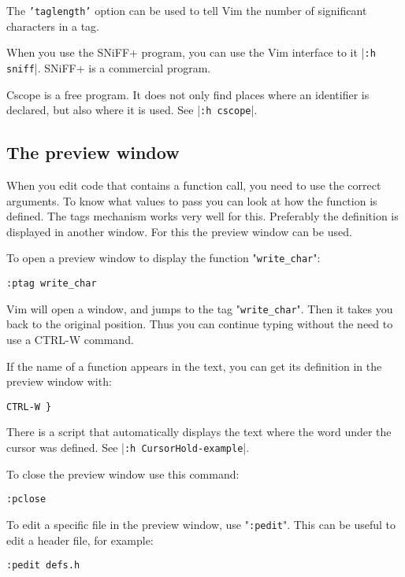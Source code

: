The \texttt{'taglength'} option can be used to tell Vim the number of significant characters in a tag.

When you use the SNiFF+ program, you can use the Vim interface to it |\texttt{:h sniff}|.
SNiFF+ is a commercial program.

Cscope is a free program.
It does not only find places where an identifier is declared, but also where it is used.
See |\texttt{:h cscope}|.
\subsection{The preview window}
When you edit code that contains a function call, you need to use the correct arguments.
To know what values to pass you can look at how the function is defined.
The tags mechanism works very well for this.
Preferably the definition is displayed in another window.
For this the preview window can be used.

To open a preview window to display the function "\texttt{write\_char}":

\begin{Verbatim}[samepage=true]
 :ptag write_char
\end{Verbatim}

Vim will open a window, and jumps to the tag "\texttt{write\_char}".
Then it takes you back to the original position.
Thus you can continue typing without the need to use a CTRL-W command.

If the name of a function appears in the text, you can get its definition in the preview window with:

\begin{Verbatim}[samepage=true]
 CTRL-W }
\end{Verbatim}

There is a script that automatically displays the text where the word under the cursor was defined.
See |\texttt{:h CursorHold-example}|.

To close the preview window use this command:

\begin{Verbatim}[samepage=true]
 :pclose
\end{Verbatim}

To edit a specific file in the preview window, use "\texttt{:pedit}".
This can be useful to edit a header file, for example:

\begin{Verbatim}[samepage=true]
 :pedit defs.h
\end{Verbatim}

